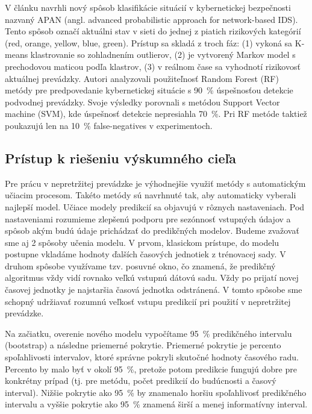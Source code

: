\documentclass[thesismargins, thesislinespacing, openright, upjsfrontpage, combineabstracts]{rnthesis}
\begin{document}
V článku \cite{shin2013advanced} navrhli nový spôsob klasifikácie situácií v kybernetickej bezpečnosti nazvaný APAN (angl. advanced probabilistic approach for network-based IDS). Tento spôsob označí aktuálni stav v sieti do jednej z piatich rizikových kategórií ({red, orange, yellow, blue, green}). Prístup sa skladá z troch fáz: (1) vykoná sa K-means klastrovanie so zohladnením outlierov, (2) je vytvorený Markov model s prechodovou maticou podľa klastrov, (3) v reálnom čase sa vyhodnotí rizikovosť aktuálnej prevádzky. Autori \cite{liu2015cloudy} analyzovali použiteľnosť Random Forest (RF) metódy pre predpovedanie kybernetickej situácie s 90~\% úspešnosťou detekcie podvodnej prevádzky. Svoje výsledky porovnali s metódou Support Vector machine (SVM), kde úspešnosť detekcie nepresiahla 70~\%. Pri RF metóde taktiež poukazujú len na 10~\% false-negatives v experimentoch.

\subsection{Prístup k riešeniu výskumného cieľa}\label{c2_metodologia}

Pre prácu v nepretržitej prevádzke je výhodnejšie využiť metódy s automatickým učiacim procesom. Takéto metódy sú navrhnuté tak, aby automaticky vyberali najlepší model. Učiace modely predikcií sa objavujú v rôznych nastaveniach. Pod nastaveniami rozumieme zlepšenú podporu pre sezónnosť vstupných údajov a spôsob akým budú údaje prichádzať do predikčných modelov. Budeme zvažovať sme aj 2 spôsoby učenia modelu. V prvom, klasickom prístupe, do modelu postupne vkladáme hodnoty ďalších časových jednotiek z trénovacej sady. V druhom spôsobe využívame tzv. posuvné okno, čo znamená, že predikčný algoritmus vždy vidí rovnako veľkú vstupnú dátovú sadu. Vždy po prijatí novej časovej jednotky je najstaršia časová jednotka odstránená. V tomto spôsobe sme schopný udržiavať rozumnú veľkosť vstupu predikcií pri použití v nepretržitej prevádzke.

Na začiatku, overenie nového modelu vypočítame 95~\% predikčného intervalu (bootstrap) a následne priemerné pokrytie. Priemerné pokrytie je percento spoľahlivosti intervalov, ktoré správne pokryli skutočné hodnoty časového radu. Percento by malo byť v okolí 95~\%, pretože potom predikcie fungujú dobre pre konkrétny prípad (tj. pre metódu, počet predikcií do budúcnosti a časový interval). Nižšie pokrytie ako 95~\% by znamenalo horšiu spoľahlivosť predikčného intervalu a vyššie pokrytie ako 95~\% znamená širší a menej informatívny interval.
\end{document}
